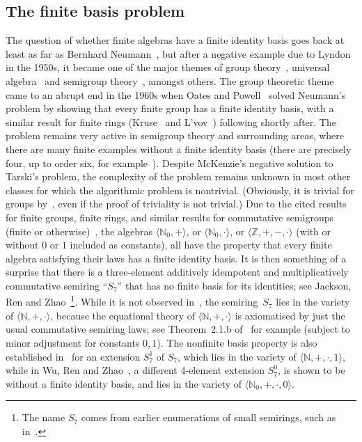 \documentclass[eqnor,reqno]{amsart}
\theoremstyle{plain}
\theoremstyle{definition}
\begin{document}
\subsection{The finite basis problem}
The question of whether finite algebras have a finite identity basis goes back at least as far as Bernhard Neumann~\cite{neu}, but after a negative example due to Lyndon~\cite{lyn} in the 1950s, it became one of the major themes of group theory~\cite{hneu}, universal algebra~\cite{wil} and semigroup theory~\cite{vol}, amongst others.  
The group theoretic theme came to an abrupt end in the 1960s when Oates and Powell~\cite{oatpow} solved Neumann's problem by showing that every finite group has a finite identity basis, with a similar result for finite rings (Kruse~\cite{kru} and L'vov~\cite{lvo}) following shortly after.  
The problem remains very active in semigroup theory and surrounding areas, where there are many finite examples without a finite identity basis (there are precisely four, up to order six, for example~\cite{leezha}).
Despite McKenzie's negative solution to Tarski's problem, the complexity of the problem remains unknown in most other classes for which the algorithmic problem is nontrivial.  (Obviously, it is trivial for groups by~\cite{oatpow}, even if the proof of triviality is not trivial.)
Due to the cited results for finite groups, finite rings, and similar results for commutative semigroups (finite or otherwise)~\cite{per}, the algebras $\langle\mathbb{N}_0,+\rangle$, or $\langle\mathbb{N}_0,\cdot\rangle$, or $\langle\mathbb{Z},+,-,\cdot\rangle$ (with or without $0$ or $1$ included as constants), all have the property that every finite algebra satisfying their laws has a finite identity basis.  
It is then something of a surprise that there is a three-element additively idempotent and multiplicatively commutative semiring ``$S_7$'' that has no finite basis for its identities; see Jackson, Ren and Zhao~\cite{JRZ}\footnote{The name $S_7$ comes from earlier enumerations of small semirings, such as in~\cite{ZRCSD}.}.    
While it is not observed in~\cite{JRZ}, the semiring~$S_7$ lies in the variety of $\langle\mathbb{N},+,\cdot\rangle$, because the equational theory of $\langle\mathbb{N},+,\cdot\rangle$ is axiomatised by just the usual commutative semiring laws; see Theorem~2.1.b of~\cite{burlee92} for example (subject to minor adjustment for constants $0,1$).  
The nonfinite basis property is also established in~\cite{JRZ} for an extension $S_7^1$ of $S_7$, which lies in the variety of $\langle\mathbb{N},+,\cdot,1\rangle$, while in Wu, Ren and Zhao~\cite{WRZ}, a different 4-element extension $S_7^0$, is shown to be without a finite identity basis, and lies in the variety of $\langle\mathbb{N}_0,+,\cdot,0\rangle$.
\end{document}
